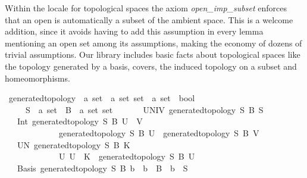 \documentclass[12pt]{scrartcl}
\begin{document}
Within the locale for topological spaces the axiom \textit{open\_imp\_subset} enforces that an open is automatically a subset of the ambient space. This is a welcome addition, since it avoids having to add this assumption in every lemma mentioning an open set among its assumptions, making the economy of dozens of trivial assumptions. Our library includes basic facts about topological spaces like the topology generated by a basis, covers, the induced topology on a subset and homeomorphisms. 
\begin{isabelle}
\isamarkupfalse%
\ generated{\isacharunderscore}{\kern0pt}topology\ {\isacharcolon}{\kern0pt}{\isacharcolon}{\kern0pt}\ {\isachardoublequoteopen}{\isacharprime}{\kern0pt}a\ set\ {\isasymRightarrow}\ {\isacharprime}{\kern0pt}a\ set\ set\ {\isasymRightarrow}\ {\isacharprime}{\kern0pt}a\ set\ {\isasymRightarrow}\ bool{\isachardoublequoteclose}\ \isanewline
\ \ \ \ \ S\ {\isacharcolon}{\kern0pt}{\isacharcolon}{\kern0pt}\ {\isachardoublequoteopen}{\isacharprime}{\kern0pt}a\ set{\isachardoublequoteclose}\ \ B\ {\isacharcolon}{\kern0pt}{\isacharcolon}{\kern0pt}\ {\isachardoublequoteopen}{\isacharprime}{\kern0pt}a\ set\ set{\isachardoublequoteclose}\isanewline
\ \ \isanewline
\ \ \ \ UNIV{\isacharcolon}{\kern0pt}\ {\isachardoublequoteopen}generated{\isacharunderscore}{\kern0pt}topology\ S\ B\ S{\isachardoublequoteclose}\isanewline
\ \ {\isacharbar}{\kern0pt}\ Int{\isacharcolon}{\kern0pt}\ {\isachardoublequoteopen}generated{\isacharunderscore}{\kern0pt}topology\ S\ B\ {\isacharparenleft}{\kern0pt}U\ {\isasyminter}\ V{\isacharparenright}{\kern0pt}{\isachardoublequoteclose}\ \isanewline
\ \ \ \ \ \ \ \ \ \ \ \ \ {\isachardoublequoteopen}generated{\isacharunderscore}{\kern0pt}topology\ S\ B\ U{\isachardoublequoteclose}\ \ {\isachardoublequoteopen}generated{\isacharunderscore}{\kern0pt}topology\ S\ B\ V{\isachardoublequoteclose}\isanewline
\ \ {\isacharbar}{\kern0pt}\ UN{\isacharcolon}{\kern0pt}\ {\isachardoublequoteopen}generated{\isacharunderscore}{\kern0pt}topology\ S\ B\ {\isacharparenleft}{\kern0pt}{\isasymUnion}K{\isacharparenright}{\kern0pt}{\isachardoublequoteclose}\ \isanewline
\ \ \ \ \ \ \ \ \ \ \ \ \ {\isachardoublequoteopen}{\isacharparenleft}{\kern0pt}{\isasymAnd}U{\isachardot}{\kern0pt}\ U\ {\isasymin}\ K\ {\isasymLongrightarrow}\ generated{\isacharunderscore}{\kern0pt}topology\ S\ B\ U{\isacharparenright}{\kern0pt}{\isachardoublequoteclose}\isanewline
\ \ {\isacharbar}{\kern0pt}\ Basis{\isacharcolon}{\kern0pt}\ {\isachardoublequoteopen}generated{\isacharunderscore}{\kern0pt}topology\ S\ B\ b{\isachardoublequoteclose}\ \ {\isachardoublequoteopen}b\ {\isasymin}\ B\ {\isasymand}\ b\ {\isasymsubseteq}\ S{\isachardoublequoteclose}
\end{isabelle}
\end{document}
